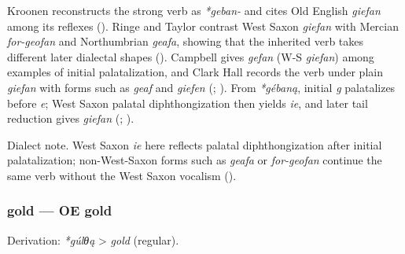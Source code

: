 \documentclass[
  british,
  a4paper,
]{article}
\begin{document}
Kroonen reconstructs the strong verb as \emph{*geban-} and cites Old
English \emph{giefan} among its reflexes
(). Ringe and Taylor
contrast West Saxon \emph{giefan} with Mercian \emph{for-geofan} and
Northumbrian \emph{geafa}, showing that the inherited verb takes
different later dialectal shapes (). Campbell gives \emph{gefan} (W-S \emph{giefan})
among examples of initial palatalization, and Clark Hall records the
verb under plain \emph{giefan} with forms such as \emph{geaf} and
\emph{giefen} (;
). From
\emph{*gébaną}, initial \emph{g} palatalizes before \emph{e}; West Saxon
palatal diphthongization then yields \emph{ie}, and later tail reduction
gives \emph{giefan} (; ).

Dialect note. West Saxon \emph{ie} here reflects palatal
diphthongization after initial palatalization; non-West-Saxon forms such
as \emph{geafa} or \emph{for-geofan} continue the same verb without the
West Saxon vocalism ().

\subsubsection{gold --- OE gold}\label{gold-oe-gold}

Derivation: \emph{*gúlθą} \textgreater{} \emph{gold} (regular).

\begingroup
\setlength{\fboxsep}{6pt}
\end{document}
